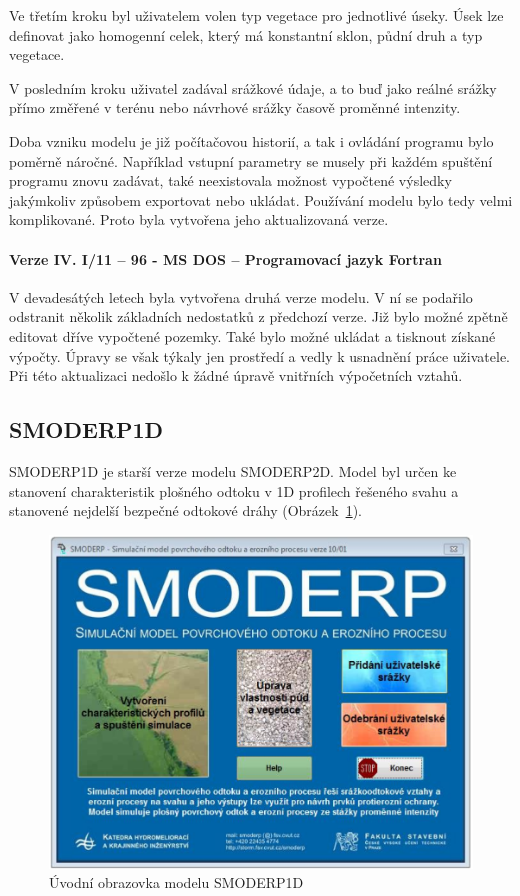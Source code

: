Ve třetím kroku byl uživatelem volen typ vegetace pro jednotlivé úseky. Úsek lze definovat jako homogenní celek, který má konstantní sklon, půdní druh a typ vegetace.

V posledním kroku uživatel zadával srážkové údaje, a to buď jako reálné srážky přímo změřené v terénu nebo návrhové srážky časově proměnné intenzity.

Doba vzniku modelu je již počítačovou historií, a tak i ovládání programu bylo poměrně náročné. Například vstupní parametry se musely při každém spuštění programu znovu zadávat, také neexistovala možnost vypočtené výsledky jakýmkoliv způsobem exportovat nebo ukládat. Používání modelu bylo tedy velmi komplikované. Proto byla vytvořena jeho aktualizovaná verze.

\paragraph*{Verze IV. I/11 – 96 - MS DOS – Programovací jazyk Fortran}

V devadesátých letech byla vytvořena druhá verze modelu. V ní se podařilo odstranit několik základních nedostatků z předchozí verze. Již bylo možné zpětně editovat dříve vypočtené pozemky. Také bylo možné ukládat a tisknout získané výpočty. Úpravy se však týkaly jen prostředí a vedly k usnadnění práce uživatele. Při této aktualizaci nedošlo k žádné úpravě vnitřních výpočetních vztahů.


\subsection*{SMODERP1D}

SMODERP1D je starší verze modelu SMODERP2D. Model byl určen ke stanovení charakteristik plošného odtoku v 1D profilech řešeného svahu a stanovené nejdelší bezpečné odtokové dráhy (Obrázek~\ref{fig:smod1d}).

\begin{figure}
  \centering
  \includegraphics[width=0.75\linewidth]{./img/smo1d.png}
    \caption{Úvodní obrazovka modelu SMODERP1D}
  \label{fig:smod1d}
\end{figure}


